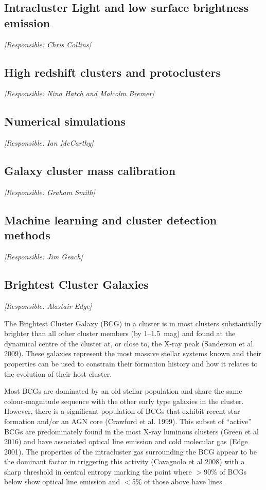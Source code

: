 \documentclass[a4paper,11pt]{article}
\begin{document}
\subsection{Intracluster Light and low surface brightness emission}

{\it [Responsible: Chris Collins]}

\subsection{High redshift clusters and protoclusters}

{\it [Responsible: Nina Hatch and Malcolm Bremer]}

\subsection{Numerical simulations}

{\it [Responsible: Ian McCarthy]}

\subsection{Galaxy cluster mass calibration}

{\it [Responsible: Graham Smith]}

\subsection{Machine learning and cluster detection methods}

{\it [Responsible: Jim Geach]}

\subsection{Brightest Cluster Galaxies}

{\it [Responsible: Alastair Edge]}

The Brightest Cluster Galaxy (BCG) in a cluster is in most
clusters substantially brighter than all other cluster
members (by 1--1.5~mag) and found at the dynamical centre
of the cluster at, or close to, the X-ray peak (Sanderson
et al. 2009). These galaxies represent the most massive 
stellar systems known and their properties can be used
to constrain their formation history and how it relates
to the evolution of their host cluster.

Most BCGs are dominated by an old stellar population
and share the same colour-magnitude sequence with the
other early type galaxies in the cluster. However, there
is a significant population of BCGs that exhibit recent
star formation and/or an AGN core (Crawford et al. 1999).
This subset of ``active'' BCGs are predominately found in
the most X-ray luminous clusters (Green et al 2016) and
have associated optical line emission and cold molecular
gas (Edge 2001). The properties of the intracluster gas 
surrounding the BCG appear to be the dominant factor
in triggering this activity (Cavagnolo et al 2008) with
a sharp threshold in central entropy marking the 
point where $>$90\% of BCGs below show optical line emission 
and $<$5\% of those above have lines. 
\end{document}
